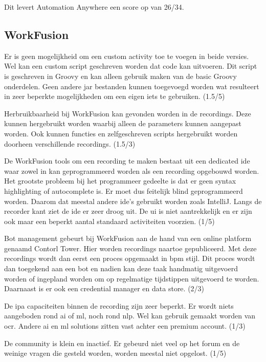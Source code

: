 Dit levert Automation Anywhere een score op van 26/34.

\subsection{WorkFusion}

Er is geen mogelijkheid om een custom activity toe te voegen in beide versies. Wel kan een custom script geschreven worden dat code kan uitvoeren. Dit script is geschreven in Groovy en kan alleen gebruik maken van de basic Groovy onderdelen. Geen andere jar bestanden kunnen toegevoegd worden wat resulteert in zeer beperkte mogelijkheden om een eigen iets te gebruiken. (1.5/5)

Herbruikbaarheid bij WorkFusion kan gevonden worden in de recordings. Deze kunnen hergebruikt worden waarbij alleen de parameters kunnen aangepast worden. Ook kunnen functies en zelfgeschreven scripts hergebruikt worden doorheen verschillende recordings. (1.5/3)

De WorkFusion tools om een recording te maken bestaat uit een dedicated \acrlong{ide} waar zowel in kan geprogrammeerd worden als een recording opgebouwd worden. Het grootste probleem bij het programmeer gedeelte is dat er geen syntax highlighting of autocomplete is. Er moet dus feitelijk blind geprogrammeerd worden. Daarom dat meestal andere \acrshort{ide}'s gebruikt worden zoals IntelliJ. Langs de recorder kant ziet de \acrshort{ide} er zeer droog uit. De \acrfull{ui} is niet aantrekkelijk en er zijn ook maar een beperkt aantal standaard \gls{activiteit}en voorzien. (1/5)

Bot management gebeurt bij WorkFusion aan de hand van een online platform genaamd Contorl Tower. Hier worden recordings naartoe gepubliceerd. Met deze recordings wordt dan eerst een proces opgemaakt in \acrshort{bpm} stijl. Dit proces wordt dan toegekend aan een bot en nadien kan deze taak handmatig uitgevoerd worden of ingepland worden om op regelmatige tijdstippen uitgevoerd te worden. Daarnaast is er ook een credential manager en data store. (2/3)

De \acrshort{ipa} capaciteiten binnen de recording zijn zeer beperkt. Er wordt niets aangeboden rond \acrshort{ai} of \acrshort{ml}, noch rond \acrshort{nlp}. Wel kan gebruik gemaakt worden van \acrshort{ocr}. Andere \acrshort{ai} en \acrshort{ml} solutions zitten vast achter een premium account. (1/3)

De community is klein en inactief. Er gebeurd niet veel op het forum en de weinige vragen die gesteld worden, worden meestal niet opgelost. (1/5)

